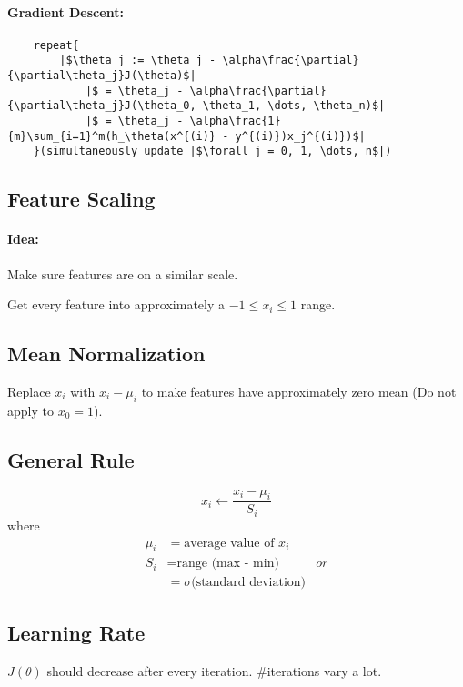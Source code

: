 \paragraph{Gradient Descent:}
\begin{verbatim}
    repeat{
        |$\theta_j := \theta_j - \alpha\frac{\partial}{\partial\theta_j}J(\theta)$|
            |$ = \theta_j - \alpha\frac{\partial}{\partial\theta_j}J(\theta_0, \theta_1, \dots, \theta_n)$|
            |$ = \theta_j - \alpha\frac{1}{m}\sum_{i=1}^m(h_\theta(x^{(i)} - y^{(i)})x_j^{(i)})$|
    }(simultaneously update |$\forall j = 0, 1, \dots, n$|)
\end{verbatim}

\subsection{Feature Scaling}
\paragraph{Idea:} Make sure features are on a similar scale.

Get every feature into approximately a $-1 \le x_i \le 1$ range.

\subsection{Mean Normalization}
Replace $x_i$ with $x_i - \mu_i$ to make features have approximately zero mean
(Do not apply to $x_0 = 1$).

\subsection*{General Rule}
\begin{equation*}
    x_i \leftarrow \frac{x_i - \mu_i}{S_i}
\end{equation*}
where
\begin{align*}
    \mu_i & = \text{average value of } x_i            \\
    S_i   & = \text{range (max - min)}           & or \\
          & = \sigma \text{(standard deviation)}
\end{align*}

\subsection{Learning Rate}
$J(\theta)$ should decrease after every iteration. $\#$iterations vary a lot.

